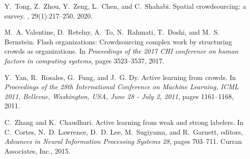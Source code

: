 \documentclass[11pt]{article}
\begin{document}
\begin{thebibliography}{10}
	Y.~Tong, Z.~Zhou, Y.~Zeng, L.~Chen, and C.~Shahabi.
	\newblock Spatial crowdsourcing: a survey.
	, 29(1):217--250, 2020.
	
	M.~A. Valentine, D.~Retelny, A.~To, N.~Rahmati, T.~Doshi, and M.~S. Bernstein.
	\newblock Flash organizations: Crowdsourcing complex work by structuring crowds
	as organizations.
	\newblock In {\em Proceedings of the 2017 CHI conference on human factors in
		computing systems}, pages 3523--3537, 2017.
	
	Y.~Yan, R.~Rosales, G.~Fung, and J.~G. Dy.
	\newblock Active learning from crowds.
	\newblock In {\em Proceedings of the 28th International Conference on Machine
		Learning, {ICML} 2011, Bellevue, Washington, USA, June 28 - July 2, 2011},
	pages 1161--1168, 2011.
	
	C.~Zhang and K.~Chaudhuri.
	\newblock Active learning from weak and strong labelers.
	\newblock In C.~Cortes, N.~D. Lawrence, D.~D. Lee, M.~Sugiyama, and R.~Garnett,
	editors, {\em Advances in Neural Information Processing Systems 28}, pages
	703--711. Curran Associates, Inc., 2015.
	
\end{thebibliography}
\end{document}
